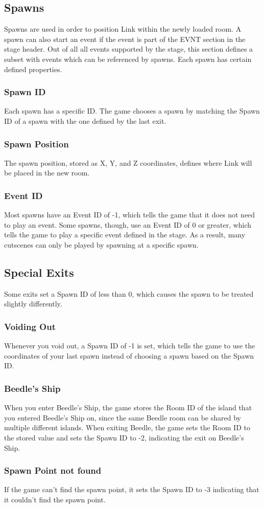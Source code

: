 \documentclass[titlepage,12pt,a4paper]{article}
\begin{document}
\subsection{Spawns}
Spawns are used in order to position Link within the newly loaded room. A spawn can also start an event if the event is part of the EVNT section in the stage header. Out of all all events supported by the stage, this section defines a subset with events which can be referenced by spawns. Each spawn has certain defined properties.

\subsubsection{Spawn ID}
Each spawn has a specific ID. The game chooses a spawn by matching the Spawn ID of a spawn with the one defined by the last exit.

\subsubsection{Spawn Position}
The spawn position, stored as X, Y, and Z coordinates, defines where Link will be placed in the new room.

\subsubsection{Event ID}
Most spawns have an Event ID of -1, which tells the game that it does not need to play an event. Some spawns, though, use an Event ID of 0 or greater, which tells the game to play a specific event defined in the stage. As a result, many cutscenes can only be played by spawning at a specific spawn.

\subsection{Special Exits}
Some exits set a Spawn ID of less than 0, which causes the spawn to be treated slightly differently.

\subsubsection{Voiding Out}
Whenever you void out, a Spawn ID of -1 is set, which tells the game to use the coordinates of your last spawn instead of choosing a spawn based on the Spawn ID.

\subsubsection{Beedle’s Ship}
When you enter Beedle’s Ship, the game stores the Room ID of the island that you entered Beedle’s Ship on, since the same Beedle room can be shared by multiple different islands. When exiting Beedle, the game sets the Room ID to the stored value and sets the Spawn ID to -2, indicating the exit on Beedle’s Ship.

\subsubsection{Spawn Point not found}
If the game can't find the spawn point, it sets the Spawn ID to -3 indicating that it couldn't find the spawn point.
\end{document}
